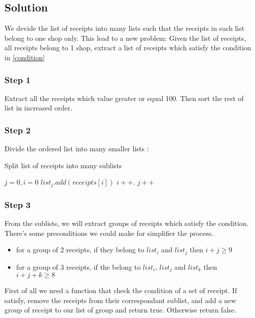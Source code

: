 \subsection{Solution}
We devide the list of receipts into many lists such that the receipts in each list belong to one shop only. This lead to a new problem: 
Given the list of receipts, all receipts belong to 1 shop, extract a list of receipts which satisfy the condition in \ref{condition}

\subsubsection{Step 1}
Extract all the receipts which value greater or equal 100. Then sort the rest of list in increased order.

\subsubsection{Step 2}
Divide the ordered list into many smaller lists :

\begin{algorithm}[H]
\caption{Split list of receipts into many sublists}
\begin{algorithmic}[1]
\State $j = 0, i = 0$
	\State $list_{j}.add(\textit{receipts}[i])$
	\State $i++$.
\Else
	\State $j++$
\EndIf
\EndWhile
\EndFunction
\end{algorithmic}
\end{algorithm}

\subsubsection{Step 3}
From the sublists, we will extract groups of receipts which satisfy the condition. There's some preconditions we could make for simplifier the process.

\begin{itemize}
\item for a group of 2 receipts, if they belong to $list_{i}$ and $list_{j}$ then $i+j \geq 9$
\item for a group of 3 receipts, if the belong to $list_{i}$, $list_{j}$ and $list_{k}$ then $i+j+k \geq 8$
\end{itemize}


First of all we need a function that check the condition of a set of receipt. If satisfy, remove the receipts from their correspondant sublist, and add a new group of receipt to our list of group and return true. Otherwise return false.

